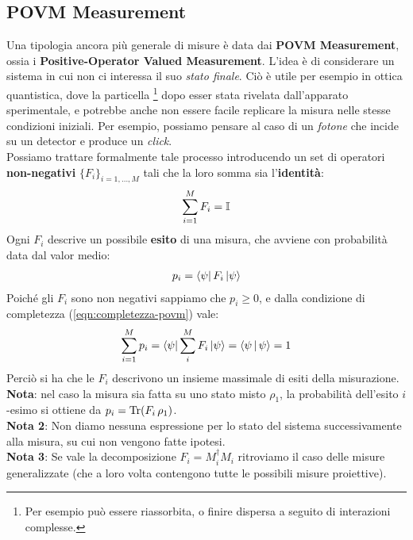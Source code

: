 \documentclass[../../InformazioneQuantistica.tex]{subfiles}
\begin{document}
\subsection{POVM Measurement}
Una tipologia ancora più generale di misure è data dai \textbf{POVM Measurement}, ossia i \textbf{Positive-Operator Valued Measurement}. L'idea è di considerare un sistema in cui non ci interessa il suo \textit{stato finale}. Ciò è utile per esempio in ottica quantistica, dove la particella \footnote{Per esempio può essere riassorbita, o finire dispersa a seguito di interazioni complesse.} dopo esser stata rivelata dall'apparato sperimentale, e potrebbe anche non essere facile replicare la misura nelle stesse condizioni iniziali. Per esempio, possiamo pensare al caso di un \textit{fotone} che incide su un detector e produce un \textit{click}.\\
Possiamo trattare formalmente tale processo introducendo un set di operatori \textbf{non-negativi} $\{F_i\}_{i=1,\dots,M}$ tali che la loro somma sia l'\textbf{identità}:
\begin{align}
\sum_{i=1}^MF_i = \mathbb{I}
\label{eqn:completezza-povm}
\end{align}
Ogni $F_i$ descrive un possibile \textbf{esito} di una misura, che avviene con probabilità data dal valor medio:
\begin{align*}
p_i = \Bra{\psi}F_i \Ket{\psi}
\end{align*}
Poiché gli $F_i$ sono non negativi sappiamo che $p_i \geq 0$, e dalla condizione di completezza (\ref{eqn:completezza-povm}) vale:
\begin{align*}
\sum_{i=1}^M p_i = \Bra{\psi}\sum_{i}^M F_i \Ket{\psi} = \Braket{\psi|\psi}=1
\end{align*}
Perciò si ha che le $F_i$ descrivono un insieme massimale di esiti della misurazione.\\

\textbf{Nota}: nel caso la misura sia fatta su uno stato misto $\rho_1$, la probabilità dell'esito $i$-esimo si ottiene da $p_i = \operatorname{Tr}(F_i\,\rho_1)$.\\

\textbf{Nota 2}: Non diamo nessuna espressione per lo stato del sistema successivamente alla misura, su cui non vengono fatte ipotesi.\\

\textbf{Nota 3}: Se vale la decomposizione $F_i = M_i^\dag M_i$ ritroviamo il caso delle misure generalizzate (che a loro volta contengono tutte le possibili misure proiettive).\\
\end{document}
